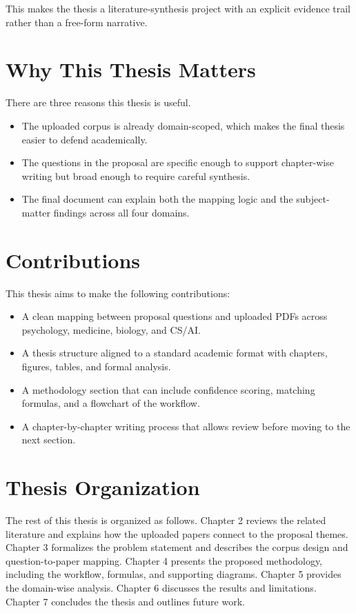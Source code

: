 \documentclass[12pt,a4paper,oneside]{book}
\begin{document}
This makes the thesis a literature-synthesis project with an explicit evidence trail rather than a free-form narrative.

\section{Why This Thesis Matters}
There are three reasons this thesis is useful.
\begin{itemize}[leftmargin=*]
  \item The uploaded corpus is already domain-scoped, which makes the final thesis easier to defend academically.
  \item The questions in the proposal are specific enough to support chapter-wise writing but broad enough to require careful synthesis.
  \item The final document can explain both the mapping logic and the subject-matter findings across all four domains.
\end{itemize}

\section{Contributions}
This thesis aims to make the following contributions:
\begin{itemize}[leftmargin=*]
  \item A clean mapping between proposal questions and uploaded PDFs across psychology, medicine, biology, and CS/AI.
  \item A thesis structure aligned to a standard academic format with chapters, figures, tables, and formal analysis.
  \item A methodology section that can include confidence scoring, matching formulas, and a flowchart of the workflow.
  \item A chapter-by-chapter writing process that allows review before moving to the next section.
\end{itemize}

\section{Thesis Organization}
The rest of this thesis is organized as follows. Chapter 2 reviews the related literature and explains how the uploaded papers connect to the proposal themes. Chapter 3 formalizes the problem statement and describes the corpus design and question-to-paper mapping. Chapter 4 presents the proposed methodology, including the workflow, formulas, and supporting diagrams. Chapter 5 provides the domain-wise analysis. Chapter 6 discusses the results and limitations. Chapter 7 concludes the thesis and outlines future work.
\end{document}
